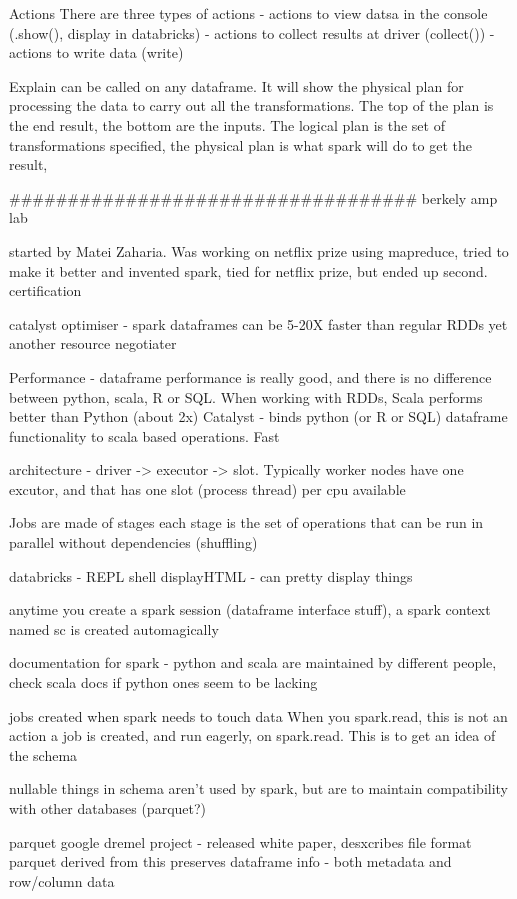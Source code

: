 \documentclass{article}
\begin{document}
Actions
There are three types of actions
- actions to view datsa in the console (.show(), display in databricks)
- actions to collect results at driver (collect())
- actions to write data (write)

Explain can be called on any dataframe. It will show the physical plan for processing the data to carry out all the transformations. The top of the plan is the end result, the bottom are the inputs. The logical plan is the set of transformations specified, the physical plan is what spark will do to get the result, 


###################################
berkely amp lab

started by Matei Zaharia. Was working on netflix prize using mapreduce, tried to make it better and invented spark, tied for netflix prize, but ended up second.
certification

catalyst optimiser - spark dataframes can be 5-20X faster than regular RDDs
yet another resource negotiater

Performance - dataframe performance is really good, and there is no difference between python, scala, R or SQL. When working with RDDs, Scala performs better than Python (about 2x)
Catalyst - binds python (or R or SQL) dataframe functionality to scala based operations. Fast

architecture - driver -> executor -> slot. Typically worker nodes have one excutor, and that has one slot (process thread) per cpu available


Jobs are made of stages
each stage is the set of operations that can be run in parallel without dependencies (shuffling)

databricks - REPL shell
displayHTML - can pretty display things


anytime you create a spark session (dataframe interface stuff), a spark context named sc is created automagically

documentation for spark - python and scala are maintained by different people, check scala docs if python ones seem to be lacking

jobs created when spark needs to touch data
When you spark.read, this is not an action
a job is created, and run eagerly, on spark.read. This is to get an idea of the schema

nullable things in schema aren't used by spark, but are to maintain compatibility with other databases (parquet?)

parquet
google dremel project - released white paper, desxcribes file format
parquet derived from this
preserves dataframe info - both metadata and row/column data
\end{document}
